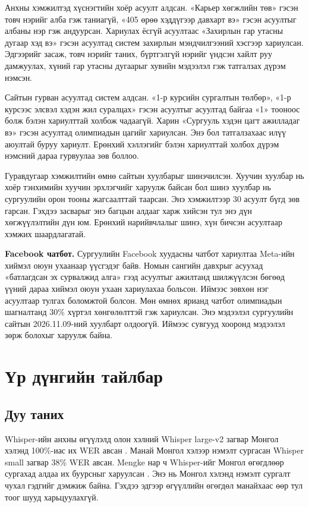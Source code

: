 Анхны хэмжилтэд хүснэгтийн хоёр асуулт алдсан. «Карьер хөгжлийн төв» гэсэн товч нэрийг алба гэж таниагүй, «405 өрөө хэддүгээр давхарт вэ» гэсэн асуултыг албаны нэр гэж андуурсан. Хариулах ёсгүй асуултаас «Захирлын гар утасны дугаар хэд вэ» гэсэн асуултад систем захирлын мэндчилгээний хэсгээр хариулсан. Эдгээрийг засаж, товч нэрийг таних, бүртгэлгүй нэрийг үндсэн хайлт руу дамжуулах, хүний гар утасны дугаарыг хувийн мэдээлэл гэж татгалзах дүрэм нэмсэн.

Сайтын гурван асуултад систем алдсан. «1-р курсийн сургалтын төлбөр», «1-р курсээс элсвэл хэдэн жил суралцах» гэсэн асуултыг асуултад байгаа «1» тооноос болж бэлэн хариулттай холбож чадаагүй. Харин «Сургууль хэдэн цагт ажилладаг вэ» гэсэн асуултад олимпиадын цагийг хариулсан. Энэ бол татгалзахаас илүү аюултай буруу хариулт. Ерөнхий хэллэгийг бэлэн хариулттай холбох дүрэм нэмсний дараа гурвуулаа зөв боллоо.

Гуравдугаар хэмжилтийн өмнө сайтын хуулбарыг шинэчилсэн. Хуучин хуулбар нь хоёр тэнхимийн хуучин эрхлэгчийг харуулж байсан бол шинэ хуулбар нь сургуулийн орон тооны жагсаалттай таарсан. Энэ хэмжилтээр 30 асуулт бүгд зөв гарсан. Гэхдээ засварыг энэ багцын алдааг харж хийсэн тул энэ дүн хөгжүүлэлтийн дүн юм. Ерөнхий нарийвчлалыг шинэ, хүн бичсэн асуултаар хэмжих шаардлагатай.

\textbf{Facebook чатбот.} Сургуулийн Facebook хуудасны чатбот хариултаа Meta-ийн хиймэл оюун ухаанаар үүсгэдэг байв. Номын сангийн давхрыг асуухад «батлагдсан эх сурвалжид алга» гээд асуултыг ажилтанд шилжүүлсэн бөгөөд үүний дараа хиймэл оюун ухаан хариулахаа больсон. Иймээс зөвхөн нэг асуултаар тулгах боломжтой болсон. Мөн өмнөх ярианд чатбот олимпиадын шагналтанд 30\% хүртэл хөнгөлөлттэй гэж хариулсан. Энэ мэдээлэл сургуулийн сайтын 2026.11.09-ний хуулбарт олдоогүй. Иймээс сувгууд хооронд мэдээлэл зөрж болохыг харуулж байна.

\section{Үр дүнгийн тайлбар}
\label{sec:res-interpretation}

\subsection{Дуу таних}

Whisper-ийн анхны өгүүлэлд олон хэлний Whisper large-v2 загвар Монгол хэлэнд 100\%-иас их WER авсан \cite{radford2023whisper}. Манай Монгол хэлээр нэмэлт сургасан Whisper small загвар 38\% WER авсан. Mengke нар ч Whisper-ийг Монгол өгөгдлөөр сургахад алдаа их буурсныг харуулсан \cite{mengke2025khalkha}. Энэ нь Монгол хэлэнд нэмэлт сургалт чухал гэдгийг дэмжиж байна. Гэхдээ эдгээр өгүүллийн өгөгдөл манайхаас өөр тул тоог шууд харьцуулахгүй.

